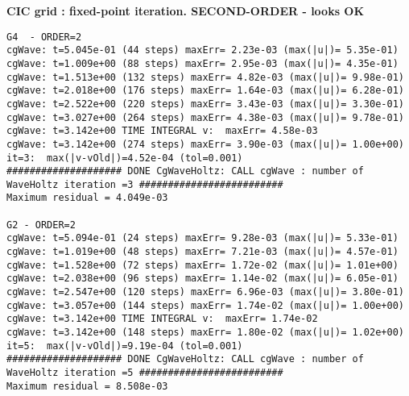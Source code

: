 \bigskip
\textbf{CIC grid  : fixed-point iteration. SECOND-ORDER - looks OK}
\begin{Verbatim}[fontsize=\scriptsize]
G4  - ORDER=2
cgWave: t=5.045e-01 (44 steps) maxErr= 2.23e-03 (max(|u|)= 5.35e-01) 
cgWave: t=1.009e+00 (88 steps) maxErr= 2.95e-03 (max(|u|)= 4.35e-01) 
cgWave: t=1.513e+00 (132 steps) maxErr= 4.82e-03 (max(|u|)= 9.98e-01) 
cgWave: t=2.018e+00 (176 steps) maxErr= 1.64e-03 (max(|u|)= 6.28e-01) 
cgWave: t=2.522e+00 (220 steps) maxErr= 3.43e-03 (max(|u|)= 3.30e-01) 
cgWave: t=3.027e+00 (264 steps) maxErr= 4.38e-03 (max(|u|)= 9.78e-01) 
cgWave: t=3.142e+00 TIME INTEGRAL v:  maxErr= 4.58e-03
cgWave: t=3.142e+00 (274 steps) maxErr= 3.90e-03 (max(|u|)= 1.00e+00) 
it=3:  max(|v-vOld|)=4.52e-04 (tol=0.001)
#################### DONE CgWaveHoltz: CALL cgWave : number of WaveHoltz iteration =3 #########################
Maximum residual = 4.049e-03

G2 - ORDER=2
cgWave: t=5.094e-01 (24 steps) maxErr= 9.28e-03 (max(|u|)= 5.33e-01) 
cgWave: t=1.019e+00 (48 steps) maxErr= 7.21e-03 (max(|u|)= 4.57e-01) 
cgWave: t=1.528e+00 (72 steps) maxErr= 1.72e-02 (max(|u|)= 1.01e+00) 
cgWave: t=2.038e+00 (96 steps) maxErr= 1.14e-02 (max(|u|)= 6.05e-01) 
cgWave: t=2.547e+00 (120 steps) maxErr= 6.96e-03 (max(|u|)= 3.80e-01) 
cgWave: t=3.057e+00 (144 steps) maxErr= 1.74e-02 (max(|u|)= 1.00e+00) 
cgWave: t=3.142e+00 TIME INTEGRAL v:  maxErr= 1.74e-02
cgWave: t=3.142e+00 (148 steps) maxErr= 1.80e-02 (max(|u|)= 1.02e+00) 
it=5:  max(|v-vOld|)=9.19e-04 (tol=0.001)
#################### DONE CgWaveHoltz: CALL cgWave : number of WaveHoltz iteration =5 #########################
Maximum residual = 8.508e-03
\end{Verbatim}


